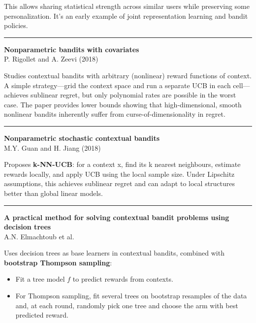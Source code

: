 \documentclass[a5paper]{article}
\providecommand{\tightlist}{%
  \setlength{\itemsep}{0pt}\setlength{\parskip}{0pt}}
\begin{document}
This allows sharing statistical strength across similar users while
preserving some personalization. It's an early example of joint
representation learning and bandit policies.

\begin{center}\rule{0.5\linewidth}{0.5pt}\end{center}

\textbf{Nonparametric bandits with covariates}\\
P. Rigollet and A. Zeevi (2018)

Studies contextual bandits with arbitrary (nonlinear) reward functions
of context. A simple strategy---grid the context space and run a
separate UCB in each cell---achieves sublinear regret, but only
polynomial rates are possible in the worst case. The paper provides
lower bounds showing that high-dimensional, smooth nonlinear bandits
inherently suffer from curse-of-dimensionality in regret.

\begin{center}\rule{0.5\linewidth}{0.5pt}\end{center}

\textbf{Nonparametric stochastic contextual bandits}\\
M.Y. Guan and H. Jiang (2018)

Proposes \textbf{k-NN-UCB}: for a context x, find its k nearest
neighbours, estimate rewards locally, and apply UCB using the local
sample size. Under Lipschitz assumptions, this achieves sublinear regret
and can adapt to local structures better than global linear models.

\begin{center}\rule{0.5\linewidth}{0.5pt}\end{center}

\textbf{A practical method for solving contextual bandit problems using
decision trees}\\
A.N. Elmachtoub et al.

Uses decision trees as base learners in contextual bandits, combined
with \textbf{bootstrap Thompson sampling}:

\begin{itemize}
\tightlist
\item
  Fit a tree model $f$ to predict rewards from contexts.
\item
  For Thompson sampling, fit several trees on bootstrap resamples of the
  data and, at each round, randomly pick one tree and choose the arm
  with best predicted reward.
\end{itemize}
\end{document}
